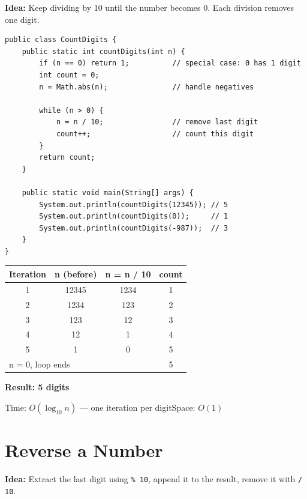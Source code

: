 \documentclass[12pt,a4paper,oneside]{book}
\begin{document}
\textbf{Idea:} Keep dividing by 10 until the number becomes 0. Each division removes one digit.

\begin{lstlisting}[caption={Count Digits --- Loop method}]
public class CountDigits {
    public static int countDigits(int n) {
        if (n == 0) return 1;          // special case: 0 has 1 digit
        int count = 0;
        n = Math.abs(n);               // handle negatives

        while (n > 0) {
            n = n / 10;                // remove last digit
            count++;                   // count this digit
        }
        return count;
    }

    public static void main(String[] args) {
        System.out.println(countDigits(12345)); // 5
        System.out.println(countDigits(0));     // 1
        System.out.println(countDigits(-987));  // 3
    }
}
\end{lstlisting}

\begin{dryrun}
\begin{center}
\begin{tabular}{cccc}
\toprule
\textbf{Iteration} & \textbf{n (before)} & \textbf{n = n / 10} & \textbf{count}\\
\midrule
1 & 12345 & 1234 & 1\\
2 & 1234  & 123  & 2\\
3 & 123   & 12   & 3\\
4 & 12    & 1    & 4\\
5 & 1     & 0    & 5\\
\multicolumn{3}{l}{n = 0, loop ends} & 5\\
\bottomrule
\end{tabular}
\end{center}
\textbf{Result: 5 digits}
\end{dryrun}

\begin{complexity}
Time: $O(\log_{10} n)$ --- one iteration per digit\quad Space: $O(1)$
\end{complexity}

\section{Reverse a Number}

\textbf{Idea:} Extract the last digit using \texttt{\% 10}, append it to the result, remove it with \texttt{/ 10}.
\end{document}
